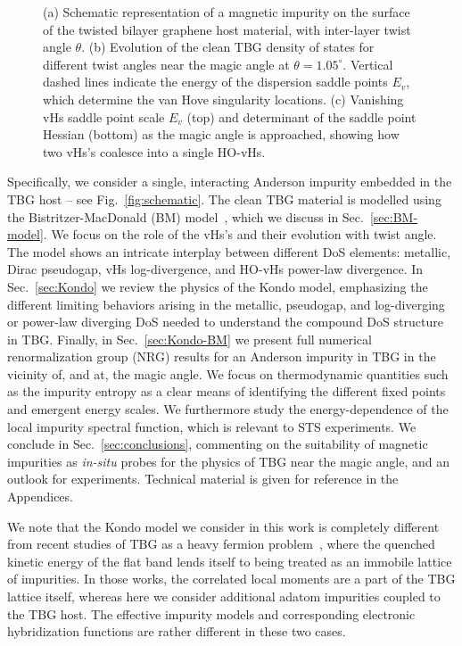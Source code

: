 \begin{figure}[t!]
\begin{subfigure}[b]{0.300\linewidth}
		\caption{{\label{fig:ShowHigherOrder}}}
	\end{subfigure}
	\caption{ %
		\small (a) Schematic representation of a magnetic impurity on the surface of the twisted bilayer graphene host material, with inter-layer twist angle $\theta$.   (b) Evolution of the clean TBG density of states for different twist angles near the magic angle at $\theta = 1.05^{\circ}$. Vertical dashed lines indicate the energy of the dispersion saddle points $E_v$, which determine the van Hove singularity locations. (c) Vanishing vHs saddle point scale $E_v$ (top) and determinant of the saddle point Hessian (bottom) as the magic angle is approached, showing how two vHs's coalesce into a single HO-vHs. }
	\label{fig:joinedfig}
\end{figure}


Specifically, we consider a single, interacting Anderson impurity embedded in the TBG host -- see Fig.~\ref{fig:schematic}. The clean TBG material is modelled using the Bistritzer-MacDonald (BM) model~\cite{Bistritzer2011}, which we discuss in Sec.~\ref{sec:BM-model}. We focus on the role of the vHs's and their evolution with twist angle. The model shows an intricate interplay between different DoS elements: metallic, Dirac pseudogap, vHs log-divergence, and HO-vHs power-law divergence. In Sec.~\ref{sec:Kondo} we review the physics of the Kondo model, emphasizing the different limiting behaviors arising in the metallic, pseudogap, and log-diverging or power-law diverging DoS needed to understand the compound DoS structure in TBG. Finally, in Sec.~\ref{sec:Kondo-BM} we present full numerical renormalization group (NRG) results for an Anderson impurity in TBG in the vicinity of, and at, the magic angle. We focus on thermodynamic quantities such as the impurity entropy as a clear means of identifying the different fixed points and emergent energy scales. We furthermore study the energy-dependence of the local impurity spectral function, which is relevant to STS experiments. We conclude in Sec.~\ref{sec:conclusions}, commenting on the suitability of magnetic impurities as \textit{in-situ} probes for the physics of TBG near the magic angle, and an outlook for experiments. Technical material is given for reference in the Appendices. 

We note that the Kondo model we consider in this work is completely different from recent studies of TBG as a heavy fermion problem~\cite{song2022magic,hu2023kondo,hu2023symmetric,zhou2023kondo}, where the quenched kinetic energy of the flat band lends itself to being treated as an immobile lattice of impurities. In those works, the correlated local moments are a part of the TBG lattice itself, whereas here we consider additional adatom impurities coupled to the TBG host. The effective impurity models and corresponding electronic hybridization functions are rather different in these two cases.


